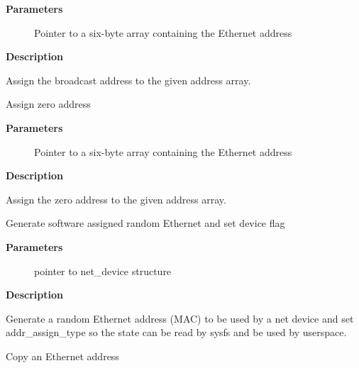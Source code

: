 \documentclass[a4paper,8pt,english]{sphinxmanual}
\begin{document}
\textbf{Parameters}
\begin{description}
\item[{}] \leavevmode
Pointer to a six-byte array containing the Ethernet address

\end{description}

\textbf{Description}

Assign the broadcast address to the given address array.

\begin{fulllineitems}
\label{networking/kapi:c.eth_zero_addr}
Assign zero address

\end{fulllineitems}


\textbf{Parameters}
\begin{description}
\item[{}] \leavevmode
Pointer to a six-byte array containing the Ethernet address

\end{description}

\textbf{Description}

Assign the zero address to the given address array.

\begin{fulllineitems}
\label{networking/kapi:c.eth_hw_addr_random}
Generate software assigned random Ethernet and set device flag

\end{fulllineitems}


\textbf{Parameters}
\begin{description}
\item[{}] \leavevmode
pointer to net\_device structure

\end{description}

\textbf{Description}

Generate a random Ethernet address (MAC) to be used by a net device
and set addr\_assign\_type so the state can be read by sysfs and be
used by userspace.

\begin{fulllineitems}
\label{networking/kapi:c.ether_addr_copy}
Copy an Ethernet address

\end{fulllineitems}
\end{document}
